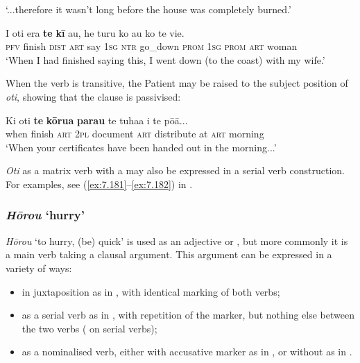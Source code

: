 \glt 
‘...therefore it wasn’t long before the house was completely burned.’ \textstyleExampleref{[R250.120]} 
\z

\ea\label{ex:11.53}
\gll I oti era \textbf{te} \textbf{kī} au, he turu ko au ko te vi{\ꞌ}e. \\
\textsc{pfv} finish \textsc{dist} \textsc{art} say \textsc{1sg} \textsc{ntr} go\_down \textsc{prom} \textsc{1sg} \textsc{prom} \textsc{art} woman \\

\glt
‘When I had finished saying this, I went down (to the coast) with my wife.’ \textstyleExampleref{[Egt-02.066]}
\z

When the  verb is transitive, the Patient may be raised to the subject position of \textit{oti}, showing that the  clause is passivised: 

\ea\label{ex:11.54}
\gll Ki oti \textbf{te} \textbf{kōrua} \textbf{parau} te tuha{\ꞌ}a {\ꞌ}i te pō{\ꞌ}ā...  \\
when finish \textsc{art} \textsc{2pl} document \textsc{art} distribute at \textsc{art} morning  \\

\glt 
‘When your certificates have been handed out in the morning...’ \textstyleExampleref{[R315.368]} 
\z

\textit{Oti} as a matrix verb with a  may also be expressed in a serial verb construction. For examples, see (\ref{ex:7.181}–\ref{ex:7.182}) in .

\subsubsection{\textit{Hōrou} ‘hurry’}\label{sec:11.3.2.3}
\textit{Hōrou} ‘to hurry, (be) quick’ is used as an adjective or , but more commonly it is a main verb taking a clausal argument. This argument can be expressed in a variety of ways: 

\begin{itemize}
\item 
in juxtaposition as in , with identical marking of both verbs; 

\item 
as a serial verb as in , with repetition of the  marker, but nothing else between the two verbs ( on serial verbs); 

\item 
as a nominalised verb, either with accusative marker as in , or without as in .

\end{itemize}

